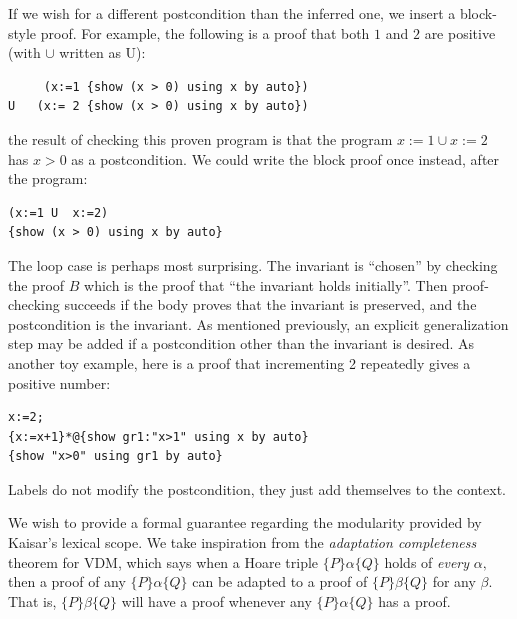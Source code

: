 \documentclass[12pt]{cmuthesis}
\theoremstyle{definition}
\theoremstyle{remark}
\begin{document}
If we wish for a different postcondition than the inferred one, we insert a block-style proof.
For example, the following is a proof that both $1$ and $2$ are positive (with $\cup$ written as U):
\begin{verbatim}
     (x:=1 {show (x > 0) using x by auto})
U   (x:= 2 {show (x > 0) using x by auto})
\end{verbatim}
the result of checking this proven program is that the program $x{:=}1 \cup x{:=}2$ has $x > 0$ as a postcondition.
We could write the block proof once instead, after the program:
\begin{verbatim}
(x:=1 U  x:=2)
{show (x > 0) using x by auto}
\end{verbatim}



The loop case is perhaps most surprising.
The invariant is ``chosen'' by checking the proof $B$ which is the proof that ``the invariant holds initially''.
Then proof-checking succeeds if the body proves that the invariant is preserved, and the postcondition is the invariant.
As mentioned previously, an explicit generalization step may be added if a postcondition other than the invariant is desired.
As another toy example, here is a proof that incrementing 2 repeatedly gives a positive number:
\begin{verbatim}
x:=2;
{x:=x+1}*@{show gr1:"x>1" using x by auto}
{show "x>0" using gr1 by auto}
\end{verbatim}

Labels do not modify the postcondition, they just add themselves to the context.

We wish to provide a formal guarantee regarding the modularity provided by Kaisar's lexical scope.
We take inspiration from the \emph{adaptation completeness}~\cite{DBLP:journals/fac/Kleymann99} theorem for VDM, which says when a Hoare triple $\{P\}\alpha\{Q\}$ holds of \emph{every} $\alpha,$ then a proof of any $\{P\}\alpha\{Q\}$ can be adapted to a proof of $\{P\}\beta\{Q\}$ for any $\beta.$
That is, $\{P\}\beta\{Q\}$ will have a proof whenever any $\{P\}\alpha\{Q\}$ has a proof.
\end{document}
